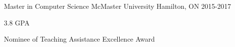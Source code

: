 \begin{cventries}

  \cventry
{Master in Computer Science} %
{McMaster University} %
{Hamilton, ON} %
{2015-2017} %
{\begin{cvitems}
		\item
		{3.8 GPA}
		\item
		{Nominee of Teaching Assistance Excellence Award}
	\end{cvitems}
}



   
   
  

\end{cventries}